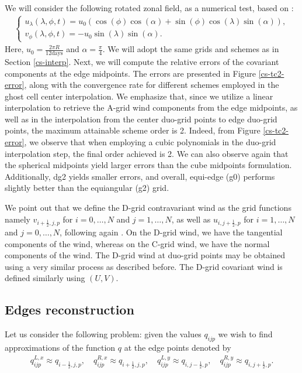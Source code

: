 We will consider the following rotated zonal field, as a numerical test, based on \citet{will:1992}:
\begin{align}
	\label{duo-wind1}
	\begin{cases}
		u_\lambda(\lambda,\phi,t) = u_0(\cos(\phi)\cos(\alpha) + \sin(\phi)\cos(\lambda)\sin(\alpha)),\\
		v_\phi(\lambda,\phi,t) = -u_0\sin(\lambda)\sin(\alpha).
	\end{cases}
\end{align}
Here,  $u_0 = \frac{2\pi R}{12 \text{days}}$ and $\alpha= \frac{\pi}{4}$. We will adopt the same grids and schemes as in Section \ref{cs-interp}.
Next, we will compute the relative errors of the covariant components at the edge midpoints.
The errors are presented in Figure \ref{cs-tc2-error}, along with the convergence rate for different schemes employed in the ghost cell center interpolation.
We emphasize that, since we utilize a linear interpolation to retrieve the A-grid wind components from the edge midpoints, as well as in the interpolation
from the center duo-grid points to edge duo-grid points, the maximum attainable scheme order is 2.
Indeed, from Figure \ref{cs-tc2-error}, we observe that when employing a cubic polynomials in the duo-grid interpolation step, the final order achieved is 2.
We can also observe again that the spherical midpoints yield larger errors than the cube midpoints formulation.
Additionally, dg2 yields smaller errors, and overall, equi-edge (g0) performs slightly better than the equiangular (g2) grid.

We point out that we define the D-grid contravariant wind as the grid functions
namely $v_{i+\frac{1}{2},j,p}$ for $i=0, \ldots, N$ and $j=1, \ldots, N$, as well as
$u_{i,j+\frac{1}{2},p}$ for $i=1, \ldots, N$ and $j=0, \ldots, N$, following again \citet{arakawa:1977}.
On the D-grid wind, we have the tangential components of the wind, whereas on the C-grid wind, we have the normal components of the wind.
The D-grid wind at duo-grid points may be obtained using a very similar process as described before.
The D-grid covariant wind is defined similarly using $(U,V)$.

\newpage
\subsection{Edges reconstruction}
\label{cs-recon}
Let us consider the following problem: given the values $q_{ijp}$ we wish to find 
approximations of the function $q$ at the edge points denoted by
\begin{align*}
	q^{L,x}_{ijp}  \approx q_{{i-\frac{1}{2}},j,p},\quad
	q^{R,x}_{ijp}  \approx q_{{i+\frac{1}{2}},j,p},\quad
	q^{L,y}_{ijp}  \approx q_{i,{j-\frac{1}{2}},p},\quad
	q^{R,y}_{ijp}  \approx q_{i,{j+\frac{1}{2}},p}.
\end{align*}

